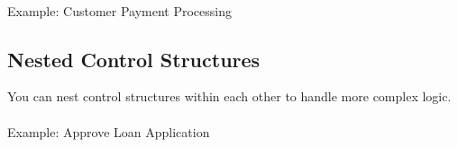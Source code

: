 \documentclass[
  letterpaper,
  DIV=11,
  numbers=noendperiod]{scrreprt}
\makeatletter
\let\oldparagraph\paragraph
\renewcommand{\paragraph}{
    \@ifstar
      \xxxParagraphStar
      \xxxParagraphNoStar
  }
\newcommand{\xxxParagraphStar}[1]{\oldparagraph*{#1}\mbox{}}
\newcommand{\xxxParagraphNoStar}[1]{\oldparagraph{#1}\mbox{}}
\newenvironment{Shaded}{\begin{snugshade}}{\end{snugshade}}
\newcommand{\BuiltInTok}[1]{\textcolor[rgb]{0.00,0.23,0.31}{#1}}
\newcommand{\ControlFlowTok}[1]{\textcolor[rgb]{0.00,0.23,0.31}{\textbf{#1}}}
\newcommand{\DecValTok}[1]{\textcolor[rgb]{0.68,0.00,0.00}{#1}}
\newcommand{\NormalTok}[1]{\textcolor[rgb]{0.00,0.23,0.31}{#1}}
\newcommand{\OperatorTok}[1]{\textcolor[rgb]{0.37,0.37,0.37}{#1}}
\newcommand{\SpecialCharTok}[1]{\textcolor[rgb]{0.37,0.37,0.37}{#1}}
\newcommand{\SpecialStringTok}[1]{\textcolor[rgb]{0.13,0.47,0.30}{#1}}
\newcommand{\StringTok}[1]{\textcolor[rgb]{0.13,0.47,0.30}{#1}}
\makeatother
\begin{document}
\paragraph{Example: Customer Payment
Processing}\label{example-customer-payment-processing}

\begin{Shaded}
\end{Shaded}

\subsection{Nested Control Structures}\label{nested-control-structures}

You can nest control structures within each other to handle more complex
logic.

\paragraph{Example: Approve Loan
Application}\label{example-approve-loan-application}
\end{document}

